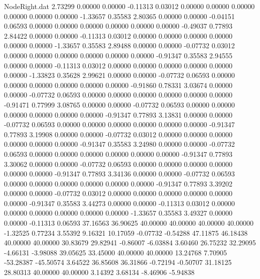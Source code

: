\begin{filecontents}{NodeRight.dat}
   2.73299    0.00000    0.00000    -0.11313    0.03012    0.00000    0.00000    0.00000    0.00000    0.00000    0.00000   -1.33657    0.35583
   2.80365    0.00000    0.00000    -0.04151    0.06593    0.00000    0.00000    0.00000    0.00000    0.00000    0.00000   -0.49037    0.77893
   2.84422    0.00000    0.00000    -0.11313    0.03012    0.00000    0.00000    0.00000    0.00000    0.00000    0.00000   -1.33657    0.35583
   2.89488    0.00000    0.00000    -0.07732    0.03012    0.00000    0.00000    0.00000    0.00000    0.00000    0.00000   -0.91347    0.35583
   2.94555    0.00000    0.00000    -0.11313    0.03012    0.00000    0.00000    0.00000    0.00000    0.00000    0.00000   -1.33823    0.35628
   2.99621    0.00000    0.00000    -0.07732    0.06593    0.00000    0.00000    0.00000    0.00000    0.00000    0.00000   -0.91860    0.78331
   3.03674    0.00000    0.00000    -0.07732    0.06593    0.00000    0.00000    0.00000    0.00000    0.00000    0.00000   -0.91471    0.77999
   3.08765    0.00000    0.00000    -0.07732    0.06593    0.00000    0.00000    0.00000    0.00000    0.00000    0.00000   -0.91347    0.77893
   3.13831    0.00000    0.00000    -0.07732    0.06593    0.00000    0.00000    0.00000    0.00000    0.00000    0.00000   -0.91347    0.77893
   3.19908    0.00000    0.00000    -0.07732    0.03012    0.00000    0.00000    0.00000    0.00000    0.00000    0.00000   -0.91347    0.35583
   3.24980    0.00000    0.00000    -0.07732    0.06593    0.00000    0.00000    0.00000    0.00000    0.00000    0.00000   -0.91347    0.77893
   3.30062    0.00000    0.00000    -0.07732    0.06593    0.00000    0.00000    0.00000    0.00000    0.00000    0.00000   -0.91347    0.77893
   3.34136    0.00000    0.00000    -0.07732    0.06593    0.00000    0.00000    0.00000    0.00000    0.00000    0.00000   -0.91347    0.77893
   3.39202    0.00000    0.00000    -0.07732    0.03012    0.00000    0.00000    0.00000    0.00000    0.00000    0.00000   -0.91347    0.35583
   3.44273    0.00000    0.00000    -0.11313    0.03012    0.00000    0.00000    0.00000    0.00000    0.00000    0.00000   -1.33657    0.35583
   3.49327    0.00000    0.00000    -0.11313    0.06593   37.16563   36.90625   40.00000   40.00000   40.00000   40.00000   -1.32525    0.77234
   3.55392    9.16321   10.17059    -0.07732   -0.54288   47.11875   46.18438   40.00000   40.00000   30.83679   29.82941   -0.86007   -6.03884
   3.60460   26.75232   32.29095    -4.66131   -3.98088   39.05625   33.45000   40.00000   40.00000   13.24768    7.70905  -53.28387  -45.50574
   3.64522   36.85608   36.31866    -0.72194   -0.50707   31.18125   28.80313   40.00000   40.00000    3.14392    3.68134   -8.46906   -5.94838

\end{filecontents}
